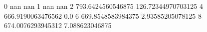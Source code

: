 0 nan nan
1 nan nan
2 793.6424560546875 126.72344970703125
4 666.9190063476562 0.0
6 669.8548583984375 2.93585205078125
8 674.0076293945312 7.088623046875
